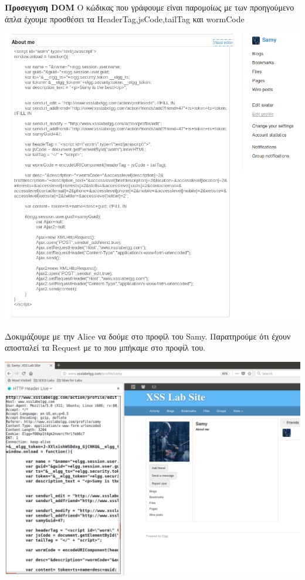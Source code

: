 \textbf{Προσεγγιση DOM}
\noindent
Ο κώδικας που γράφουμε είναι παρομοίως με των προηγούμενο άπλα έχουμε
προσθέσει τα HeaderTag,jsCode,tailTag και wormCode 
\begin{center}
			\includegraphics[width=1\textwidth]{image/6.10.PNG}		
\end{center}
\noindent
Δοκιμάζουμε με την Alice να δούμε στο προφίλ του Samy. Παρατηρούμε ότι έχουν
αποσταλεί τα Request με το που μπήκαμε στο προφίλ του. 
\begin{center}
			\includegraphics[width=1\textwidth]{image/6.11.PNG}		
\end{center}
